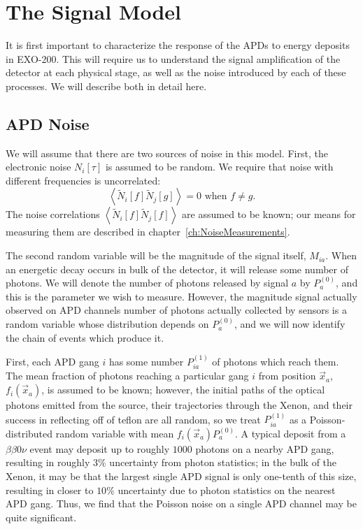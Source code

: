\section{The Signal Model}

It is first important to characterize the response of the APDs to energy deposits in EXO-200.  This will require us to understand the signal amplification of the detector at each physical stage, as well as the noise introduced by each of these processes.  We will describe both in detail here.

\subsection{APD Noise}\label{sec:DescriptionOfPhotonNoise}

We will assume that there are two sources of noise in this model.  First, the electronic noise $N_i[\tau]$ is assumed to be random.  We require that noise with different frequencies is uncorrelated:
\[\left< \widetilde{N}_i[f] \widetilde{N}_j[g] \right> = 0 \text{~when~} f \ne g.\]
The noise correlations $\left< \widetilde{N}_i[f] \widetilde{N}_j[f] \right>$ are assumed to be known; our means for measuring them are described in chapter~\ref{ch:NoiseMeasurements}.

The second random variable will be the magnitude of the signal itself, $M_{ia}$.  When an energetic decay occurs in bulk of the detector, it will release some number of photons.  We will denote the number of photons released by signal $a$ by $P^{(0)}_a$, and this is the parameter we wish to measure.  However, the magnitude signal actually observed on APD channels number of photons actually collected by sensors is a random variable whose distribution depends on $P^{(0)}_a$, and we will now identify the chain of events which produce it.

First, each APD gang $i$ has some number $P^{(1)}_{ia}$ of photons which reach them.  The mean fraction of photons reaching a particular gang $i$ from position $\vec{x}_a$, $f_i(\vec{x}_a)$, is assumed to be known; however, the initial paths of the optical photons emitted from the source, their trajectories through the Xenon, and their success in reflecting off of teflon are all random, so we treat $P^{(1)}_{ia}$ as a Poisson-distributed random variable with mean $f_i(\vec{x}_a)P^{(0)}_a$.  A typical deposit from a $\beta\beta 0\nu$ event may deposit up to roughly $1000$ photons on a nearby APD gang, resulting in roughly $3\%$ uncertainty from photon statistics; in the bulk of the Xenon, it may be that the largest single APD signal is only one-tenth of this size, resulting in closer to $10\%$ uncertainty due to photon statistics on the nearest APD gang.  Thus, we find that the Poisson noise on a single APD channel may be quite significant.

